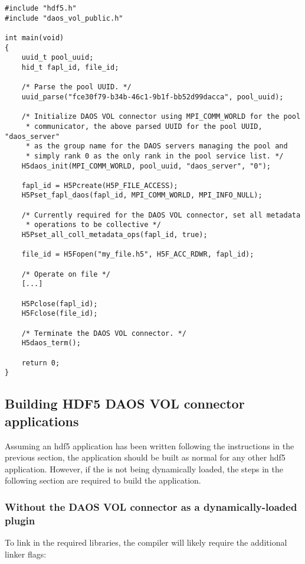 \documentclass[../users_guide.tex]{subfiles}
\begin{document}
\begin{verbatim}
#include "hdf5.h"
#include "daos_vol_public.h"

int main(void)
{
    uuid_t pool_uuid;
    hid_t fapl_id, file_id;

    /* Parse the pool UUID. */
    uuid_parse("fce30f79-b34b-46c1-9b1f-bb52d99dacca", pool_uuid);

    /* Initialize DAOS VOL connector using MPI_COMM_WORLD for the pool
     * communicator, the above parsed UUID for the pool UUID, "daos_server"
     * as the group name for the DAOS servers managing the pool and
     * simply rank 0 as the only rank in the pool service list. */
    H5daos_init(MPI_COMM_WORLD, pool_uuid, "daos_server", "0");

    fapl_id = H5Pcreate(H5P_FILE_ACCESS);
    H5Pset_fapl_daos(fapl_id, MPI_COMM_WORLD, MPI_INFO_NULL);

    /* Currently required for the DAOS VOL connector, set all metadata
     * operations to be collective */
    H5Pset_all_coll_metadata_ops(fapl_id, true); 

    file_id = H5Fopen("my_file.h5", H5F_ACC_RDWR, fapl_id);

    /* Operate on file */
    [...]

    H5Pclose(fapl_id);
    H5Fclose(file_id);

    /* Terminate the DAOS VOL connector. */
    H5daos_term();

    return 0;
}
\end{verbatim}

\subsection{Building HDF5 DAOS VOL connector applications}

Assuming an \acrshort{hdf5} application has been written following the instructions in the previous section, the application should be built as normal for any other
\acrshort{hdf5} application. However,
if the \dvc{} is not being dynamically loaded, the steps in the following
section are required to build the application.

\subsubsection{Without the DAOS VOL connector as a dynamically-loaded plugin}

To link in the required libraries, the compiler will likely require the
additional linker flags:
\end{document}
